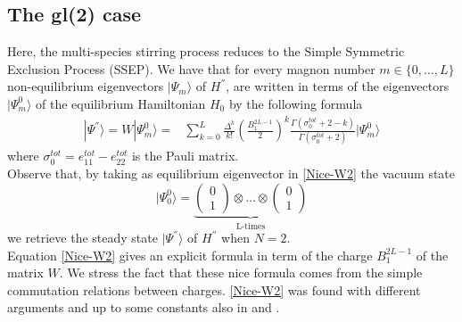 \documentclass[10pt]{article}
\numberwithin{equation}{section}
\numberwithin{equation}{subsection}
\begin{document}
\subsection{The gl(2) case}\label{SubsectionGL2}
Here, the multi-species stirring process reduces to the Simple Symmetric Exclusion Process (SSEP). We have that for every magnon number $m\in\{0,\ldots,L\}$ non-equilibrium eigenvectors $|\Psi_{m}\rangle$ of $H^{''}$, are written in terms of the eigenvectors $|\Psi_{m}^{0}\rangle$ of the equilibrium Hamiltonian $H_{0}$ by the following formula 
\begin{equation}\label{Nice-W2}
	\begin{split}
		|\Psi^{''}\rangle=W|\Psi_{m}^{0}\rangle=&	\sum_{k=0}^{L}\frac{\Delta^{k}}{k!}\left(\frac{B_{1}^{2L-1}}{2}\right)^{k}\frac{\Gamma(\sigma_{0}^{tot}+2-k)}{\Gamma(\sigma_{0}^{tot}+2)}|\Psi_{m}^{0}\rangle
	\end{split}
\end{equation}
where $\sigma_{0}^{tot}=e_{11}^{tot}-e_{22}^{tot}$ is the Pauli matrix. \\
Observe that, by taking as equilibrium eigenvector in \eqref{Nice-W2} the vacuum state 
\begin{equation}
	|\Psi_{0}^{0}\rangle=\underbrace{\begin{pmatrix}
		0\\1
	\end{pmatrix}\otimes \ldots\otimes \begin{pmatrix}
	0\\
	1
\end{pmatrix}}_{\text{L-times}}
\end{equation} we retrieve the steady state $|\Psi^{''}\rangle$ of $H^{''}$ when $N=2$. \\
Equation \eqref{Nice-W2} gives an explicit formula in term of the charge $B_{1}^{2L-1}$ of the matrix $W$. We stress the fact that these nice formula comes from the simple commutation relations between charges. \eqref{Nice-W2} was found with different arguments and up to some constants also in \cite{frassek2020duality} and \cite{frassek2020eigenstates}.
\end{document}
